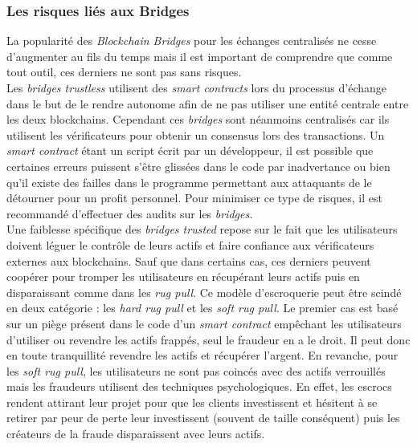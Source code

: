 \subsubsection{Les risques liés aux Bridges}

La popularité des \textit{Blockchain Bridges} pour les échanges centralisés ne cesse d’augmenter au fils du temps mais il est important de comprendre que comme tout outil, ces derniers ne sont pas sans risques. \\

Les \textit{bridges trustless} utilisent des \textit{smart contracts} lors du processus d’échange dans le but de le rendre autonome afin de ne pas utiliser une entité centrale entre les deux blockchains. Cependant ces \textit{bridges} sont néanmoins centralisés car ils utilisent les vérificateurs pour obtenir un consensus lors des transactions.
Un \textit{smart contract} étant un script écrit par un développeur, il est possible que certaines erreurs puissent s’être glissées dans le code par inadvertance ou bien qu’il existe des failles dans le programme permettant aux attaquants de le détourner pour un profit personnel. 
Pour minimiser ce type de risques, il est recommandé d’effectuer des audits sur les \textit{bridges.} \\

Une faiblesse spécifique des \textit{bridges trusted} repose sur le fait que les utilisateurs doivent léguer le contrôle de leurs actifs et faire confiance aux vérificateurs externes aux blockchains. Sauf que dans certains cas, ces derniers peuvent coopérer pour tromper les utilisateurs en récupérant leurs actifs puis en disparaissant comme dans les \textit{rug pull}\cite{EthereumRisks}. Ce modèle d’escroquerie peut être scindé en deux catégorie : les \textit{hard rug pull} et les \textit{soft rug pull}\cite{Hacken}. Le premier cas est basé sur un piège présent dans le code d’un \textit{smart contract} empêchant les utilisateurs d’utiliser ou revendre les actifs frappés, seul le fraudeur en a le droit. Il peut donc en toute tranquillité revendre les actifs et récupérer l’argent. En revanche, pour les \textit{soft rug pull}, les utilisateurs ne sont pas coincés avec des actifs verrouillés mais les fraudeurs utilisent des techniques psychologiques. En effet, les escrocs rendent attirant leur projet pour que les clients investissent et hésitent à se retirer par peur de perte leur investissent (souvent de taille conséquent) puis les créateurs de la fraude disparaissent avec leurs actifs.\\

